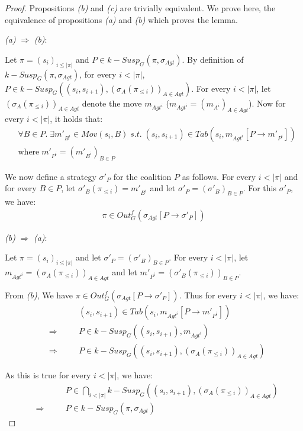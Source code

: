 \begin{proof}
Propositions \textit{(b)} and \textit{(c)} are trivially equivalent. We prove here, the equivalence of propositions \textit{(a)} and \textit{(b)} which proves the lemma.

\textit{(a)} $\Rightarrow$ \textit{(b)}:

Let $\pi = (s_{i})_{i\leq \vert \pi \vert}$ and $P \in k-Susp_{G}(\pi, \sigma_{Agt})$. By definition of $k-Susp_{G}(\pi, \sigma_{Agt})$, for every $i < \vert \pi \vert$, $P \in k-Susp_{G}((s_{i}, s_{i+1}), (\sigma_{A}(\pi_{\leq i}))_{A\in Agt})$. For every $i < \vert \pi \vert$, let $(\sigma_{A}(\pi_{\leq i}))_{A\in Agt}$ denote the move $m_{Agt^{i}}$ ($m_{Agt^{i}} = (m_{A^{i}})_{A\in Agt}$). Now for every $i < \vert \pi \vert$, it holds that:
\begin{align*}
&\forall B \in P. \; \exists m'_{B^{i}} \in Mov(s_{i}, B) \; s.t. \; (s_{i}, s_{i+1}) \in Tab(s_{i}, m_{Agt^{i}}[P \rightarrow m'_{P^{i}}])\\
&\text{where} \; m'_{P^{i}} = (m'_{B^{i}})_{B\in P}
\end{align*}

We now define a strategy $\sigma'_{P}$ for the coalition $P$ as follows. For every $i < \vert \pi \vert$ and for every $B \in P$, let $\sigma'_{B}(\pi_{\leq i}) = m'_{B^{i}}$ and let $\sigma'_{P} = (\sigma'_{B})_{B\in P}$. For this $\sigma'_{P}$, we have:
\begin{align*}
\pi \in Out_{G}^{f}(\sigma_{Agt}[P \rightarrow \sigma'_{P}])
\end{align*}

\textit{(b)} $\Rightarrow$ \textit{(a)}:

Let $\pi = (s_{i})_{i\leq \vert \pi \vert}$ and let $\sigma'_{P} = (\sigma'_{B})_{B \in P}$. For every $i < \vert \pi \vert$, let $m_{Agt^{i}} = (\sigma_{A}(\pi_{\leq i}))_{A\in Agt}$ and let $m'_{P^{i}} = (\sigma'_{B}(\pi_{\leq i}))_{B\in P}$.

From \textit{(b)}, We have $\pi \in Out_{G}^{f}(\sigma_{Agt}[P \rightarrow \sigma'_{P}])$. Thus for every $i < \vert \pi \vert$, we have:
\begin{align*}
&\qquad & &(s_{i}, s_{i+1}) \in Tab(s_{i}, m_{Agt^{i}}[P \rightarrow m'_{P^{i}}])\\
&\Rightarrow & &P \in k-Susp_{G}((s_{i}, s_{i+1}), m_{Agt^{i}})\\
&\Rightarrow & &P \in k-Susp_{G}((s_{i}, s_{i+1}), (\sigma_{A}(\pi_{\leq i}))_{A\in Agt})
\end{align*}

As this is true for every $i < \vert \pi \vert$, we have:
\begin{align*}
&\qquad & &P \in \bigcap \limits_{i<\vert \pi \vert} k-Susp_{G}((s_{i}, s_{i+1}), (\sigma_{A}(\pi_{\leq i}))_{A\in Agt})\\
&\Rightarrow & &P \in k-Susp_{G}(\pi, \sigma_{Agt})
\end{align*}
\end{proof}

